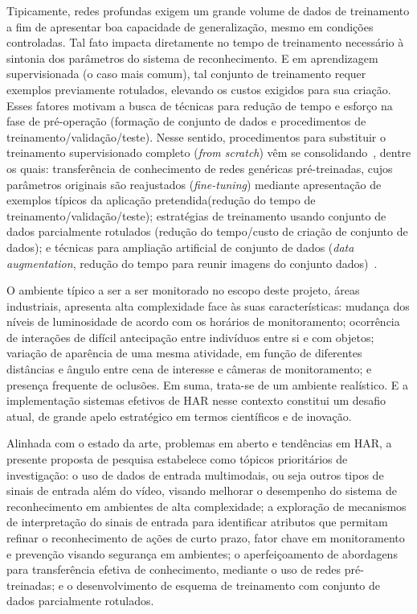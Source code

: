  Tipicamente, redes profundas exigem um grande volume de dados de treinamento a fim de apresentar boa capacidade de generalização, mesmo em condições controladas. Tal fato impacta diretamente no tempo de treinamento necessário à sintonia dos parâmetros do sistema de reconhecimento. E em aprendizagem supervisionada (o caso mais comum), tal conjunto de treinamento requer exemplos previamente rotulados, elevando os custos exigidos para sua criação. Esses fatores motivam a busca de técnicas para redução de tempo e esforço na fase de pré-operação (formação de conjunto de dados e procedimentos de treinamento/validação/teste). Nesse sentido, procedimentos para  substituir o treinamento supervisionado completo (\emph{from scratch}) vêm se consolidando~\parencite{herath-2017}, dentre os quais: transferência de conhecimento de redes genéricas pré-treinadas, cujos parâmetros originais são reajustados  (\emph{fine-tuning}) mediante apresentação de exemplos típicos da aplicação pretendida(redução do tempo de treinamento/validação/teste); estratégias de treinamento usando conjunto de dados parcialmente rotulados (redução do tempo/custo de criação de conjunto de dados); e técnicas para ampliação artificial de conjunto de dados (\emph{data augmentation}, redução do tempo para reunir imagens do conjunto dados)~\parencite{wang-2015}.
%

O ambiente típico a ser a ser monitorado no escopo deste projeto, áreas industriais, apresenta alta complexidade face às suas características: mudança dos níveis de luminosidade de acordo com os horários de monitoramento; ocorrência de interações de difícil antecipação entre indivíduos entre si e com objetos; variação de aparência de uma mesma atividade, em função de diferentes distâncias e ângulo entre cena de interesse e câmeras de monitoramento; e presença frequente de oclusões. Em suma, trata-se de um ambiente realístico. E a implementação sistemas efetivos de HAR nesse contexto constitui um desafio atual, de grande apelo estratégico em termos científicos e de inovação.
%

Alinhada com o estado da arte, problemas em aberto e tendências em HAR, a presente proposta de pesquisa estabelece como tópicos prioritários de investigação: o uso de dados de entrada  multimodais, ou seja outros tipos de sinais de entrada além do vídeo, visando melhorar o desempenho do sistema de reconhecimento em ambientes de alta complexidade; a exploração de mecanismos de interpretação do sinais de entrada para identificar atributos que permitam refinar o reconhecimento de ações de curto prazo, fator chave em monitoramento e prevenção visando segurança em ambientes; o aperfeiçoamento de abordagens para transferência efetiva de conhecimento, mediante o uso de redes pré-treinadas; e o desenvolvimento de esquema de treinamento com conjunto de dados parcialmente rotulados.
